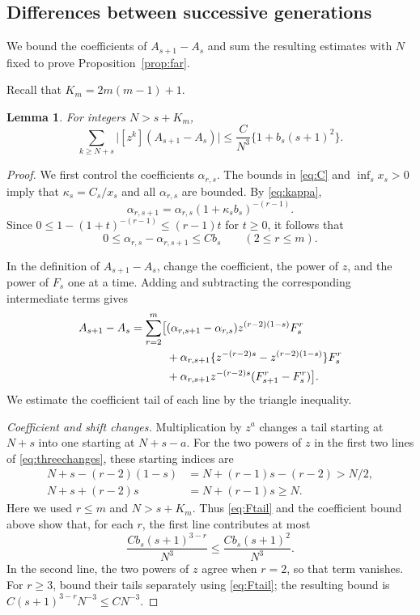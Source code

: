 \documentclass[11pt,letterpaper,reqno]{amsart}
\numberwithin{equation}{section}
\theoremstyle{plain}
\newtheorem{lemma}[theorem]{Lemma}
\theoremstyle{remark}
\begin{document}
\subsection{Differences between successive generations}
We bound the coefficients of $A_{s+1}-A_s$ and sum the resulting estimates with $N$ fixed to prove Proposition~\ref{prop:far}.

Recall that $K_m=2m(m-1)+1$.
\begin{lemma}\label{lem:sourcedifference}
For integers $N>s+K_m$,
\begin{equation}\label{eq:sourcedifference}
 \sum_{k\ge N+s}\bigl|[z^k](A_{s+1}-A_s)\bigr|
 \le \frac C{N^3}\{1+b_s(s+1)^2\}.
\end{equation}
\end{lemma}
\begin{proof}
We first control the coefficients $\alpha_{r,s}$. The bounds in \eqref{eq:C} and $\inf_s x_s>0$ imply that $\kappa_s=C_s/x_s$ and all $\alpha_{r,s}$ are bounded. By \eqref{eq:kappa},
\[
 \alpha_{r,s+1}=\alpha_{r,s}(1+\kappa_sb_s)^{-(r-1)}.
\]
Since $0\le1-(1+t)^{-(r-1)}\le(r-1)t$ for $t\ge0$, it follows that
\[
 0\le\alpha_{r,s}-\alpha_{r,s+1}\le Cb_s
 \qquad(2\le r\le m).
\]

In the definition of $A_{s+1}-A_s$, change the coefficient, the power of $z$, and the power of $F_s$ one at a time. Adding and subtracting the corresponding intermediate terms gives
\begin{align}\label{eq:threechanges}
 A_{s+1}-A_s=\sum_{r=2}^m\bigl[&
  (\alpha_{r,s+1}-\alpha_{r,s})z^{(r-2)(1-s)}F_s^r\notag\\
 &+\alpha_{r,s+1}\{z^{-(r-2)s}-z^{(r-2)(1-s)}\}F_s^r\notag\\
 &+\alpha_{r,s+1}z^{-(r-2)s}(F_{s+1}^r-F_s^r)\bigr].
\end{align}
We estimate the coefficient tail of each line by the triangle inequality.

\emph{Coefficient and shift changes.}
Multiplication by $z^a$ changes a tail starting at $N+s$ into one starting at $N+s-a$. For the two powers of $z$ in the first two lines of \eqref{eq:threechanges}, these starting indices are
\[
\begin{aligned}
 N+s-(r-2)(1-s)&=N+(r-1)s-(r-2)>N/2,\\
 N+s+(r-2)s&=N+(r-1)s\ge N.
\end{aligned}
\]
Here we used $r\le m$ and $N>s+K_m$. Thus \eqref{eq:Ftail} and the coefficient bound above show that, for each $r$, the first line contributes at most
\[
 \frac{Cb_s(s+1)^{3-r}}{N^3}
 \le\frac{Cb_s(s+1)^2}{N^3}.
\]
In the second line, the two powers of $z$ agree when $r=2$, so that term vanishes. For $r\ge3$, bound their tails separately using \eqref{eq:Ftail}; the resulting bound is $C(s+1)^{3-r}N^{-3}\le CN^{-3}$.


\end{proof}
\end{document}

